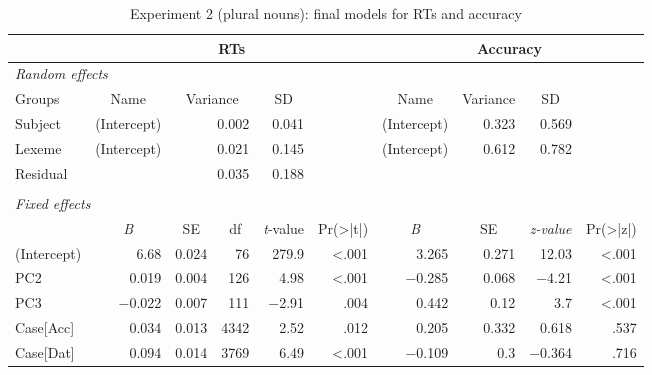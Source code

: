 \documentclass[output=paper, modfonts,newtxmath,hidelinks]{langscibook}
\begin{document}
\begin{sidewaystable}
	\caption{Experiment 2 (plural nouns): final models for RTs and accuracy}
	\label{tab:LMERpl}
	\begin{tabular}{l*{9}r} 
  	\lsptoprule
    ~			& \multicolumn{5}{c}{RTs} & \multicolumn{4}{c}{Accuracy}\\
    \midrule
    \multicolumn{10}{l}{\textit{Random effects}}\\
    Groups  &   \multicolumn{1}{c}{Name}	        &   \multicolumn{2}{c}{Variance} &	                             \multicolumn{1}{c}{SD}       &~&  \multicolumn{1}{c}{Name}	 &                                \multicolumn{1}{c}{Variance}        &	\multicolumn{1}{c}{SD}   &~\\
    Subject &   \multicolumn{1}{l}{(Intercept)}     &   \multicolumn{2}{r}{0.002}
            &	0.041                               &~& \multicolumn{1}{l}{(Intercept)}
            &   0.323	                            &	0.569   &~\\
	Lexeme  &   \multicolumn{1}{l}{(Intercept)}     &   \multicolumn{2}{r}{0.021}
	        &	0.145                               &~& \multicolumn{1}{l}{(Intercept)}
	        &   0.612                               &	0.782  &~\\
	Residual&   \multicolumn{1}{l}{}                &   \multicolumn{2}{r}{0.035}
	        &	0.188                               &~& \multicolumn{4}{l}{}    \\
    \\         
	\multicolumn{10}{l}{\textit{Fixed effects}}\\
   	~			&\multicolumn{1}{c}{\textit{B}} &	\multicolumn{1}{c}{SE} 	& \multicolumn{1}{c}{df} &    \multicolumn{1}{c}{\textit{t}-value}	& \multicolumn{1}{c}{Pr(>|t|)}	&    \multicolumn{1}{c}{\textit{B}} &	\multicolumn{1}{c}{SE}		&    \multicolumn{1}{c}{ \textit{z-value}}	& \multicolumn{1}{c}{Pr(>|z|)} \\
    (Intercept)	&	6.68	&	0.024	& 76 &	279.9		& <.001	&
    				3.265	&	0.271	& 12.03	&	<.001\\
	PC2			&	0.019	&	0.004	& 126	& 4.98		& <.001 &
    				$-$0.285	&	0.068	& $-$4.21	& <.001\\
	PC3			&	$-$0.022	&	0.007	&	111		&	$-$2.91	&	.004	&	
					0.442	&	0.12	&	3.7		&	<.001\\
	Case[Acc]	&	0.034	&	0.013	&	4342	&	2.52	&	.012	&	
					0.205	&	0.332	&	0.618	&	.537\\
	Case[Dat]	&	0.094	&	0.014	&	3769	&	6.49	&	<.001	&	
					$-$0.109	&	0.3		&	$-$0.364	&	.716\\

\end{tabular}
\end{sidewaystable}
\end{document}

